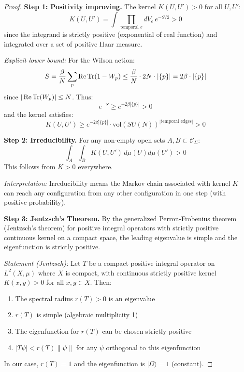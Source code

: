 \begin{proof}
\textbf{Step 1: Positivity improving.} The kernel $K(U, U') > 0$ for all $U, U'$:
\[
K(U, U') = \int \prod_{\text{temporal } e} dV_e \, e^{-S/2} > 0
\]
since the integrand is strictly positive (exponential of real function) and 
integrated over a set of positive Haar measure.

\textit{Explicit lower bound:} For the Wilson action:
\[
S = \frac{\beta}{N}\sum_p \operatorname{Re}\operatorname{Tr}(1 - W_p) \leq \frac{\beta}{N} \cdot 2N \cdot |\{p\}| = 2\beta \cdot |\{p\}|
\]
since $|\operatorname{Re}\operatorname{Tr}(W_p)| \leq N$. Thus:
\[
e^{-S} \geq e^{-2\beta |\{p\}|} > 0
\]
and the kernel satisfies:
\[
K(U, U') \geq e^{-2\beta |\{p\}|} \cdot \text{vol}(SU(N))^{|\text{temporal edges}|} > 0
\]

\textbf{Step 2: Irreducibility.} For any non-empty open sets $A, B \subset \mathcal{C}_\Sigma$:
\[
\int_A \int_B K(U, U') \, d\mu(U) d\mu(U') > 0
\]
This follows from $K > 0$ everywhere.

\textit{Interpretation:} Irreducibility means the Markov chain associated with 
kernel $K$ can reach any configuration from any other configuration in one step 
(with positive probability).

\textbf{Step 3: Jentzsch's Theorem.} By the generalized Perron-Frobenius theorem 
(Jentzsch's theorem) for positive integral operators with strictly positive 
continuous kernel on a compact space, the leading eigenvalue is simple and the 
eigenfunction is strictly positive.

\textit{Statement (Jentzsch):} Let $T$ be a compact positive integral operator 
on $L^2(X, \mu)$ where $X$ is compact, with continuous strictly positive kernel 
$K(x, y) > 0$ for all $x, y \in X$. Then:
\begin{enumerate}[label=(\alph*)]
\item The spectral radius $r(T) > 0$ is an eigenvalue
\item $r(T)$ is simple (algebraic multiplicity 1)
\item The eigenfunction for $r(T)$ can be chosen strictly positive
\item $|T\psi| < r(T)\|\psi\|$ for any $\psi$ orthogonal to this eigenfunction
\end{enumerate}

In our case, $r(T) = 1$ and the eigenfunction is $|\Omega\rangle = 1$ (constant).
\end{proof}







